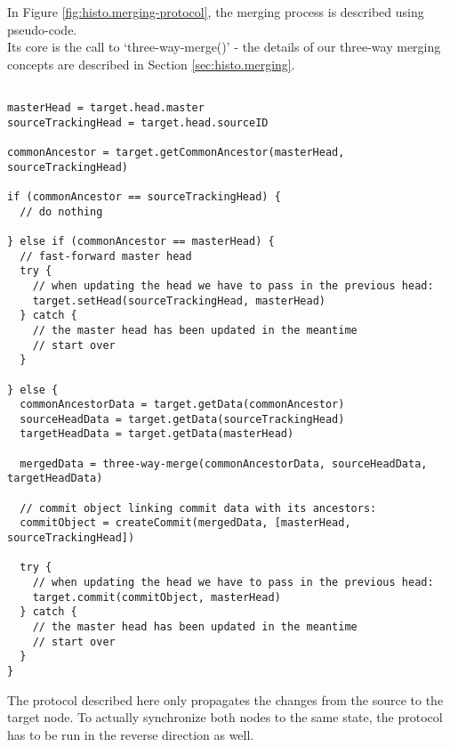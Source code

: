 In Figure \ref{fig:histo.merging-protocol}, the merging process is described using pseudo-code.\\
Its core is the call to `three-way-merge()' - the details of our three-way merging concepts are described in Section \ref{sec:histo.merging}.\\

\begin{lstlisting}[caption=Merging Protocol, label=fig:histo.merging-protocol]

masterHead = target.head.master
sourceTrackingHead = target.head.sourceID

commonAncestor = target.getCommonAncestor(masterHead, sourceTrackingHead)

if (commonAncestor == sourceTrackingHead) {
  // do nothing

} else if (commonAncestor == masterHead) {
  // fast-forward master head
  try {
    // when updating the head we have to pass in the previous head:
    target.setHead(sourceTrackingHead, masterHead)
  } catch {
    // the master head has been updated in the meantime
    // start over
  }

} else {
  commonAncestorData = target.getData(commonAncestor)
  sourceHeadData = target.getData(sourceTrackingHead)
  targetHeadData = target.getData(masterHead)

  mergedData = three-way-merge(commonAncestorData, sourceHeadData, targetHeadData)

  // commit object linking commit data with its ancestors:
  commitObject = createCommit(mergedData, [masterHead, sourceTrackingHead])

  try {
    // when updating the head we have to pass in the previous head:
    target.commit(commitObject, masterHead)    
  } catch {
    // the master head has been updated in the meantime
    // start over
  }
}

\end{lstlisting}

The protocol described here only propagates the changes from the source to the target node.
To actually synchronize both nodes to the same state, the protocol has to be run in the reverse direction as well.

